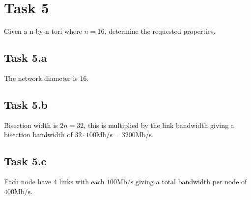 \section{Task 5}
Given a n-by-n tori where $n=16$, determine the requested properties.

\subsection{Task 5.a}
The network diameter is $16$.


\subsection{Task 5.b}
Bisection width is $2n = 32$, this is multiplied by the link bandwidth giving a
bisection bandwidth of $32 \cdot 100\text{Mb/s} = 3200\text{Mb/s}$.

\subsection{Task 5.c}
Each node have 4 links with each $100\text{Mb/s}$ giving a total bandwidth per
node of $400\text{Mb/s}$.
